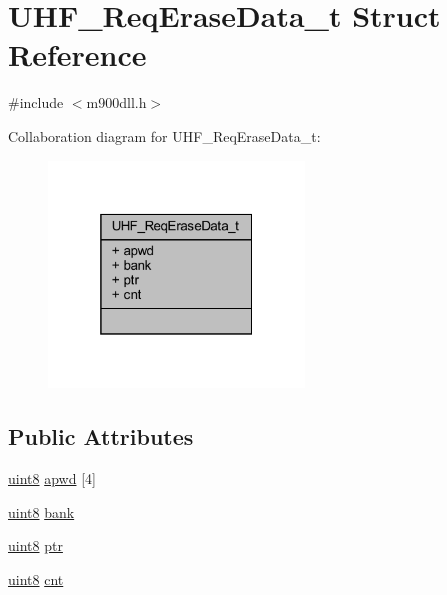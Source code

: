 \hypertarget{struct_u_h_f___req_erase_data__t}{}\section{U\+H\+F\+\_\+\+Req\+Erase\+Data\+\_\+t Struct Reference}
\label{struct_u_h_f___req_erase_data__t}


{\ttfamily \#include $<$m900dll.\+h$>$}



Collaboration diagram for U\+H\+F\+\_\+\+Req\+Erase\+Data\+\_\+t\+:
\nopagebreak
\begin{figure}[H]
\begin{center}
\leavevmode
\includegraphics[width=193pt]{struct_u_h_f___req_erase_data__t__coll__graph}
\end{center}
\end{figure}
\subsection*{Public Attributes}
\begin{DoxyCompactItemize}
\item 
\mbox{\hyperlink{m900dll_8h_adde6aaee8457bee49c2a92621fe22b79}{uint8}} \mbox{\hyperlink{struct_u_h_f___req_erase_data__t_ad5d8ea8552fdbcc2f46c6eb11748a02a}{apwd}} \mbox{[}4\mbox{]}
\item 
\mbox{\hyperlink{m900dll_8h_adde6aaee8457bee49c2a92621fe22b79}{uint8}} \mbox{\hyperlink{struct_u_h_f___req_erase_data__t_a994d9032a9b53866b65eed203ee34e8c}{bank}}
\item 
\mbox{\hyperlink{m900dll_8h_adde6aaee8457bee49c2a92621fe22b79}{uint8}} \mbox{\hyperlink{struct_u_h_f___req_erase_data__t_a42a12cb1a29b01e4f14493734780ba12}{ptr}}
\item 
\mbox{\hyperlink{m900dll_8h_adde6aaee8457bee49c2a92621fe22b79}{uint8}} \mbox{\hyperlink{struct_u_h_f___req_erase_data__t_acf3ac6dbb06f332273851d0bec9d4e7e}{cnt}}
\end{DoxyCompactItemize}


